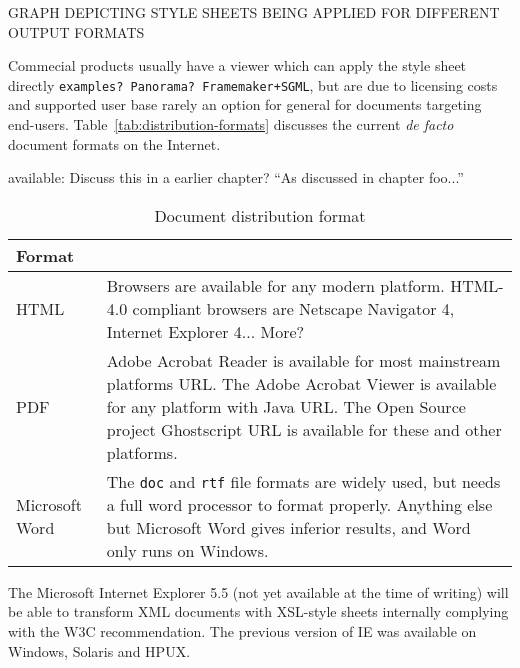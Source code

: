 \textsf{GRAPH DEPICTING STYLE SHEETS BEING APPLIED FOR DIFFERENT
  OUTPUT FORMATS}





Commecial products usually have a viewer which can apply the style
sheet directly \texttt{examples? Panorama? Framemaker+SGML}, but are
due to licensing costs and supported user base rarely an option for
general for documents targeting end-users.
Table~\vref{tab:distribution-formats} discusses the current \textit{de
  facto} document formats on the Internet.  


available: \textsf{Discuss this in a earlier chapter?  ``As discussed
  in chapter foo...''}

\begin{table}[htbp]
  \begin{center}
    \begin{tabular}{|l|p{10cm}|}
      \hline\hline
      Format & \\
      \hline

      HTML & Browsers are available for any modern platform.  HTML-4.0
      compliant browsers are Netscape Navigator 4, Internet Explorer
      4... \textsf{More?} \\ 
      
      PDF & Adobe Acrobat Reader is available for most
      mainstream platforms \textsf{URL}.  The Adobe Acrobat Viewer is
      available for any platform with Java \textsf{URL}.  The Open
      Source project Ghostscript \textsf{URL} is available for these
      and other platforms. \\
  
      
      Microsoft Word & The \texttt{doc} and \texttt{rtf} file formats
      are widely used, but needs a full word processor to format
      properly.  Anything else but Microsoft Word gives inferior
      results, and Word only runs on Windows.
      \\

      \hline
    \end{tabular}
    \caption{Document distribution format}
    \label{tab:distribution-formats}
  \end{center}
\end{table}


The Microsoft Internet Explorer 5.5 (not yet available at the time of
writing) will be able to transform XML documents with XSL-style sheets
internally complying with the W3C recommendation.  The previous
version of IE was available on Windows, Solaris and HPUX.

